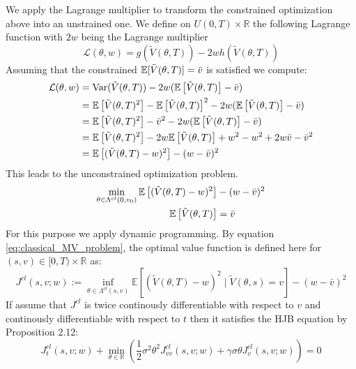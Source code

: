 \documentclass[oneside, a4paper, onecolumn, 11pt]{article}
\begin{document}
We apply the Lagrange multiplier to transform the constrained optimization  above into an unstrained one. We define on $U(0,T) \times \mathbb{R}$  the following Lagrange function with $2w$ being the Lagrange multiplier
\[
\mathcal{L}(\theta, w) = g( \tilde{V}(\theta,T)) - 2w h(\tilde{V}(\theta,T))
\]
Assuming that the constrained $\mathbb{E}[\tilde{V}(\theta,T)] = \Bar{v}$ is satisfied we compute:
\begin{align*}
\mathcal{L}(\theta, w) &= \text{Var}(\tilde{V}(\theta,T)) - 2w(\mathbb{E}\left[\tilde{V}(\theta,T)\right] -\Bar{v}) \\
&= \mathbb{E}\left[\tilde{V}(\theta,T)^2\right] - \mathbb{E}\left[\tilde{V}(\theta,T)\right]^2 - 2w(\mathbb{E}\left[\tilde{V}(\theta,T)\right] -\Bar{v}) \\
&= \mathbb{E}\left[\tilde{V}(\theta,T)^2\right] - \Bar{v}^2 - 2w(\mathbb{E}\left[\tilde{V}(\theta,T)\right] -\Bar{v}) \\
&= \mathbb{E}\left[\tilde{V}(\theta,T)^2\right] - 2w\mathbb{E}\left[\tilde{V}(\theta,T)\right] + w^2 - w^2 + 2w\Bar{v} - \Bar{v}^2 \\ 
&= \mathbb{E}\left[(\tilde{V}(\theta,T) - w)^2\right] - (w - \Bar{v})^2 
\end{align*}
This leads to the unconstrained optimization problem.
\begin{equation}
\begin{aligned} 
 \min_{\theta \in \Lambda^{cl}(0,v_0)} \mathbb{E}\left[(\tilde{V}(\theta,T) - w)^2\right]& - (w - \Bar{v})^2  \\ 
\mathbb{E}\left[\tilde{V}(\theta,T) \right] &= \Bar{v}
\end{aligned} \label{eq:classical_MV_problem}
\end{equation}
For this purpose we apply dynamic programming. By equation \eqref{eq:classical_MV_problem}, the optimal value function is defined here for $(s,v) \in [0,T) \times \mathbb{R}$ as: 
    \begin{equation}
        J^{cl}(s,v;w) := \inf_{\theta \in \Lambda^{cl}(s,v)} \mathbb{E}\left[(\tilde{V}(\theta,T) - w)^2 \mid \tilde{V}(\theta,s) =v \right] - (w - \bar{v})^2 \label{optimal_value_classical}
    \end{equation}
If assume that $J^{cl}$ is twice continously differentiable with respect to $v$ and continously differentiable with respect to $t$ then it satisfies the HJB equation by Proposition 2.12: 
\begin{equation}
    J^{cl}_t(s,v;w) + \min_{\theta \in \mathbb{R}}\left(\frac{1}{2}\sigma^2 \theta^2 J^{cl}_{vv}(s,v;w) + \gamma \sigma \theta J^{cl}_v(s,v;w)\right)=0 \label{eq:HJB_classical}
\end{equation}
\end{document}
